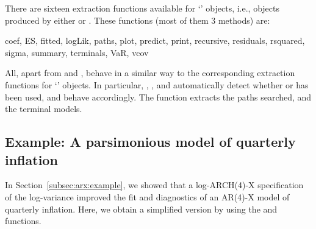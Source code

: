 \documentclass[article,nojss]{jss}
\begin{document}
There are sixteen extraction functions available for `'
objects, i.e., objects produced by either  or
. These functions (most of them 3 methods)
are:
%
\begin{Code}
  coef, ES, fitted, logLik, paths, plot, predict, print, recursive,
  residuals, rsquared, sigma, summary, terminals, VaR, vcov
\end{Code}
%
All, apart from  and , behave in a similar
way to the corresponding extraction functions for `'
objects. In particular, , ,  and
 automatically detect whether  or
 has been used, and behave accordingly. The 
function extracts the paths searched, and  the
terminal models.

\subsection{Example: A parsimonious model of quarterly inflation}
\label{subsec:gets:inflation:example}

In Section~\ref{subsec:arx:example}, we showed that a log-ARCH(4)-X specification of the log-variance improved the fit and diagnostics of an AR(4)-X model of quarterly inflation. Here, we obtain a simplified version by using the  and  functions.
\end{document}
